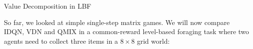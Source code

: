 \begin{frame}[t]{Value Decomposition in LBF}

    So far, we looked at simple single-step matrix games. We will now compare IDQN, VDN and QMIX in a common-reward level-based foraging task where two agents need to collect three items in a $8\times8$ grid world:


\end{frame}
